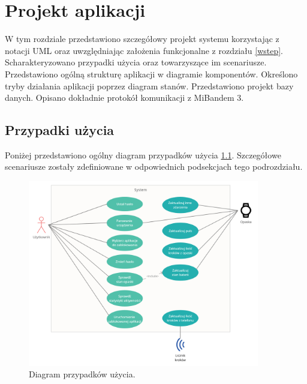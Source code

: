 \chapter{Projekt aplikacji}
\thispagestyle{chapterBeginStyle}
\label{rozdzial2}
W tym rozdziale przedstawiono szczegółowy projekt systemu korzystając z notacji UML oraz uwzględniając założenia funkcjonalne z rozdziału \ref{wstep}.
Scharakteryzowano przypadki użycia oraz towarzyszące im scenariusze. Przedstawiono ogólną strukturę aplikacji w diagramie komponentów. Określono tryby działania aplikacji poprzez diagram stanów. Przedstawiono projekt bazy danych. Opisano dokładnie protokół komunikacji z MiBandem 3. 

\section{Przypadki użycia}
Poniżej przedstawiono ogólny diagram przypadków użycia \ref{use_case}. Szczegółowe scenariusze zostały zdefiniowane w odpowiednich podsekcjach tego podrozdziału.
\begin{figure}[H]
    \begin{center}
        \includegraphics[width=0.9\textwidth]{UseCaseDiagram.png}
    \end{center}
    \caption{{\color{dgray}Diagram przypadków użycia.}} \label{use_case}
\end{figure}

